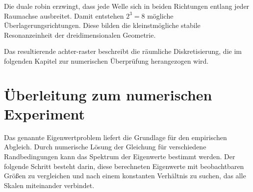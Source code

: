 Die duale \gls{robin} erzwingt,
dass jede Welle sich in beiden Richtungen
entlang jeder Raumachse ausbreitet.
Damit entstehen \(2^3 = 8\)
mögliche Überlagerungsrichtungen.
Diese bilden die kleinstmögliche stabile
Resonanzeinheit der dreidimensionalen Geometrie.

Das resultierende \gls{achter-raster}
beschreibt die räumliche Diskretisierung,
die im folgenden Kapitel
zur numerischen Überprüfung herangezogen wird.

\section{Überleitung zum numerischen Experiment}

Das genannte Eigenwertproblem liefert die Grundlage für den empirischen Abgleich.
Durch numerische Lösung der Gleichung für verschiedene Randbedingungen
kann das Spektrum der Eigenwerte bestimmt werden.
Der folgende Schritt besteht darin,
diese berechneten Eigenwerte mit beobachtbaren Größen zu vergleichen
und nach einem konstanten Verhältnis zu suchen,
das alle Skalen miteinander verbindet.

